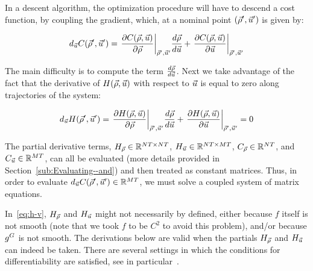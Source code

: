 In a descent algorithm, the optimization procedure will have to descend
a cost function, by coupling the gradient, which, at a nominal point
$\left(\nominal{\state},\nominal{\control}\right)$ is given by:

\begin{equation}
	d_{\control}\cost\left(\nominal{\state},\nominal{\control}\right)=\evaluate{\pfrac{\cost\text{\ensuremath{\left(\state,\control\right)}}}{\state}}{\nominal{\state},\nominal{\control}}\Dfrac{\state}{\control}+\evaluate{\pfrac{\cost\text{\ensuremath{\left(\state,\control\right)}}}{\control}}{\nominal{\state},\nominal{\control}}\label{eq:j-v}
\end{equation}


The main difficulty is to compute the term $\frac{d\vec{\rho}}{d\vec{u}}$.
Next we take advantage of the fact that the derivative of $H\left(\state,\control\right)$
with respect to $\vec{u}$ is equal to zero along trajectories of
the system:

\begin{equation}
	d_{\control}\sys\left(\nominal{\state},\nominal{\control}\right)=\evaluate{\pfrac{\sys\text{\ensuremath{\left(\state,\control\right)}}}{\state}}{\nominal{\state},\nominal{\control}}\Dfrac{\state}{\control}+\evaluate{\pfrac{\sys\text{\ensuremath{\left(\state,\control\right)}}}{\control}}{\nominal{\state},\nominal{\control}}=0\label{eq:h-v}
\end{equation}


The partial derivative terms, $H_{\vec{\rho}}\in\mathbb{R}^{NT\times NT}$,
$H_{\vec{u}}\in\mathbb{R}^{NT\times MT}$, $C_{\vec{\rho}}\in\mathbb{R}^{NT}$,
and $C_{\vec{u}}\in\mathbb{R}^{MT}$, can all be evaluated (more
details provided in Section~\ref{sub:Evaluating--and}) and then
treated as constant matrices. Thus, in order to evaluate $d_{\control}\cost\left(\nominal{\state},\nominal{\control}\right)\in\mathbb{R}^{\ncontrols\ntime}$,
we must solve a coupled system of matrix equations.
\begin{note}
	In~\eqref{eq:h-v}, $H_{\vec{\rho}}$ and $H_{\vec{u}}$ might not necessarily by defined,
	either because $f$ itself is not smooth (note that we took $f$ to
	be $C^{2}$ to avoid this problem), and/or because $g^{G}$ is not
	smooth. The derivations below are valid when the partials $H_{\vec{\rho}}$ and
	$H_{\vec{u}}$ can indeed be taken. There are several settings in which the
	conditions for differentiability are satisfied, see in particular~\cite{Gugat2005,Flasskamp2012}.
\end{note}

